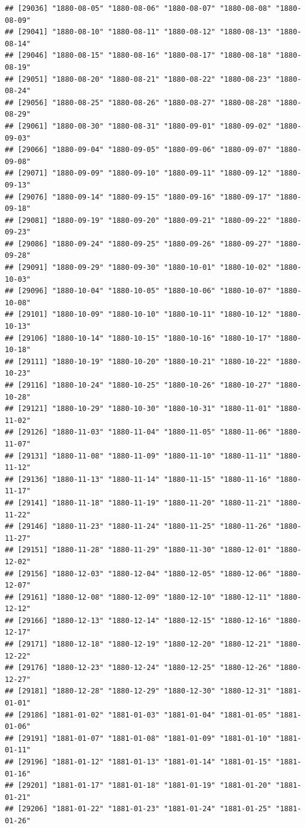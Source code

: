 \documentclass{article}\usepackage[]{graphicx}\usepackage[]{color}
\makeatletter
\newenvironment{kframe}{%
 \def\at@end@of@kframe{}%
 \ifinner\ifhmode%
  \def\at@end@of@kframe{\end{minipage}}%
  \begin{minipage}{\columnwidth}%
 \fi\fi%
 \def\FrameCommand##1{\hskip\@totalleftmargin \hskip-\fboxsep
 \colorbox{shadecolor}{##1}\hskip-\fboxsep
     \hskip-\linewidth \hskip-\@totalleftmargin \hskip\columnwidth}%
 \MakeFramed {\advance\hsize-\width
   \@totalleftmargin\z@ \linewidth\hsize
   \@setminipage}}%
 {\par\unskip\endMakeFramed%
 \at@end@of@kframe}
\newenvironment{knitrout}{}{} %
\makeatother
\begin{document}
\begin{description}
\begin{knitrout}
\begin{kframe}
\begin{verbatim}
## [29036] "1880-08-05" "1880-08-06" "1880-08-07" "1880-08-08" "1880-08-09"
## [29041] "1880-08-10" "1880-08-11" "1880-08-12" "1880-08-13" "1880-08-14"
## [29046] "1880-08-15" "1880-08-16" "1880-08-17" "1880-08-18" "1880-08-19"
## [29051] "1880-08-20" "1880-08-21" "1880-08-22" "1880-08-23" "1880-08-24"
## [29056] "1880-08-25" "1880-08-26" "1880-08-27" "1880-08-28" "1880-08-29"
## [29061] "1880-08-30" "1880-08-31" "1880-09-01" "1880-09-02" "1880-09-03"
## [29066] "1880-09-04" "1880-09-05" "1880-09-06" "1880-09-07" "1880-09-08"
## [29071] "1880-09-09" "1880-09-10" "1880-09-11" "1880-09-12" "1880-09-13"
## [29076] "1880-09-14" "1880-09-15" "1880-09-16" "1880-09-17" "1880-09-18"
## [29081] "1880-09-19" "1880-09-20" "1880-09-21" "1880-09-22" "1880-09-23"
## [29086] "1880-09-24" "1880-09-25" "1880-09-26" "1880-09-27" "1880-09-28"
## [29091] "1880-09-29" "1880-09-30" "1880-10-01" "1880-10-02" "1880-10-03"
## [29096] "1880-10-04" "1880-10-05" "1880-10-06" "1880-10-07" "1880-10-08"
## [29101] "1880-10-09" "1880-10-10" "1880-10-11" "1880-10-12" "1880-10-13"
## [29106] "1880-10-14" "1880-10-15" "1880-10-16" "1880-10-17" "1880-10-18"
## [29111] "1880-10-19" "1880-10-20" "1880-10-21" "1880-10-22" "1880-10-23"
## [29116] "1880-10-24" "1880-10-25" "1880-10-26" "1880-10-27" "1880-10-28"
## [29121] "1880-10-29" "1880-10-30" "1880-10-31" "1880-11-01" "1880-11-02"
## [29126] "1880-11-03" "1880-11-04" "1880-11-05" "1880-11-06" "1880-11-07"
## [29131] "1880-11-08" "1880-11-09" "1880-11-10" "1880-11-11" "1880-11-12"
## [29136] "1880-11-13" "1880-11-14" "1880-11-15" "1880-11-16" "1880-11-17"
## [29141] "1880-11-18" "1880-11-19" "1880-11-20" "1880-11-21" "1880-11-22"
## [29146] "1880-11-23" "1880-11-24" "1880-11-25" "1880-11-26" "1880-11-27"
## [29151] "1880-11-28" "1880-11-29" "1880-11-30" "1880-12-01" "1880-12-02"
## [29156] "1880-12-03" "1880-12-04" "1880-12-05" "1880-12-06" "1880-12-07"
## [29161] "1880-12-08" "1880-12-09" "1880-12-10" "1880-12-11" "1880-12-12"
## [29166] "1880-12-13" "1880-12-14" "1880-12-15" "1880-12-16" "1880-12-17"
## [29171] "1880-12-18" "1880-12-19" "1880-12-20" "1880-12-21" "1880-12-22"
## [29176] "1880-12-23" "1880-12-24" "1880-12-25" "1880-12-26" "1880-12-27"
## [29181] "1880-12-28" "1880-12-29" "1880-12-30" "1880-12-31" "1881-01-01"
## [29186] "1881-01-02" "1881-01-03" "1881-01-04" "1881-01-05" "1881-01-06"
## [29191] "1881-01-07" "1881-01-08" "1881-01-09" "1881-01-10" "1881-01-11"
## [29196] "1881-01-12" "1881-01-13" "1881-01-14" "1881-01-15" "1881-01-16"
## [29201] "1881-01-17" "1881-01-18" "1881-01-19" "1881-01-20" "1881-01-21"
## [29206] "1881-01-22" "1881-01-23" "1881-01-24" "1881-01-25" "1881-01-26"

\end{verbatim}
\end{kframe}
\end{knitrout}
\end{description}
\end{document}
